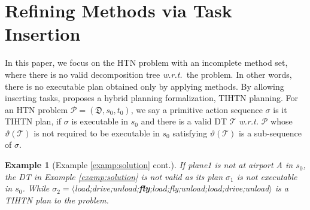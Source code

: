 \documentclass[letterpaper]{article} %
\newtheorem{examp}{Example}
\newcommand{\HtnDomain}{\mathfrak{D}}
\newcommand{\HtnProblem}{\mathcal{P}}
\newcommand{\Constraint}{\prec}
\newcommand{\Constraints}{\Constraint}
\newcommand{\tn}{\mathsf{tn}}
\newcommand{\plan}{\sigma}
\newcommand{\Dtree}{\mathcal{T}}
\newcommand{\yield}{\vartheta}
\begin{document}
\section{Refining Methods via Task Insertion}
In this paper, we focus on the HTN problem with an incomplete method set, where there is no valid decomposition tree \emph{w.r.t.}\ the problem.
In other words, there is no executable plan obtained only by applying methods.
By allowing inserting tasks, \cite{geier2011decidability} proposes a hybrid planning formalization, TIHTN planning.
For an HTN problem $\HtnProblem = (\HtnDomain,s_0,t_0)$, we say a primitive action sequence $\plan$ is it TIHTN plan, if $\plan$ is executable in $s_0$ and
there is a valid DT $\Dtree$ \emph{w.r.t.} $\HtnProblem$ whose $\yield(\Dtree)$ is not required to be executable in $s_0$ satisfying $\yield(\Dtree)$ is a sub-sequence of $\plan$.
\begin{examp}[Example \ref{examp:solution} cont.]\label{examp:tihtn_solution}
If \textsf{plane1} is not at airport A in $s_0$, the DT in Example \ref{examp:solution} is not valid as its plan $\plan_1$ is not executable in $s_0$.
While $\plan_2=\langle${\small\textsf{load};\textsf{drive};\textsf{unload};\textbf{fly};\textsf{load};\textsf{fly};\textsf{unload};\textsf{load};\textsf{drive};\textsf{unload}}$\rangle$ is a TIHTN plan to the problem.
\end{examp}


%
%
%
\end{document}
